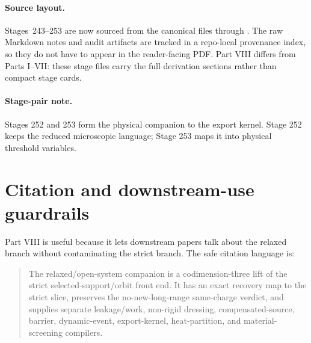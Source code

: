 \paragraph{Source layout.}
Stages~243--253 are now sourced from the canonical files  through .  The raw Markdown notes and audit artifacts are tracked in a repo-local provenance index, so they do not have to appear in the reader-facing PDF.  Part VIII differs from Parts I--VII: these stage files carry the full derivation sections rather than compact stage cards.



















\paragraph{Stage-pair note.}
Stages 252 and 253 form the physical companion to the export kernel. Stage 252 keeps the reduced microscopic language; Stage 253 maps it into physical threshold variables.





\section{Citation and downstream-use guardrails}
\label{sec:app-part08-downstream-guardrails}

Part VIII is useful because it lets downstream papers talk about the relaxed branch without contaminating the strict branch.  The safe citation language is:
\begin{quote}
The relaxed/open-system companion is a codimension-three lift of the strict selected-support/orbit front end.  It has an exact recovery map to the strict slice, preserves the no-new-long-range same-charge verdict, and supplies separate leakage/work, non-rigid dressing, compensated-source, barrier, dynamic-event, export-kernel, heat-partition, and material-screening compilers.
\end{quote}

